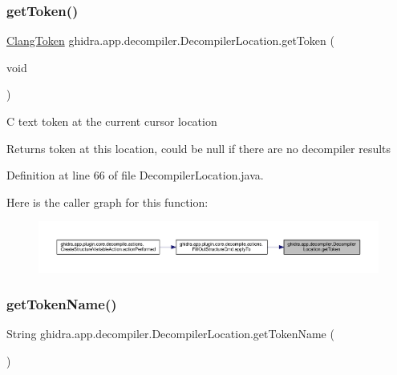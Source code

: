 \subsubsection{\texorpdfstring{getToken()}{getToken()}}
{\footnotesize\ttfamily \mbox{\hyperlink{classghidra_1_1app_1_1decompiler_1_1_clang_token}{Clang\+Token}} ghidra.\+app.\+decompiler.\+Decompiler\+Location.\+get\+Token (\begin{DoxyParamCaption}\item[{void}]{ }\end{DoxyParamCaption})\hspace{0.3cm}{\ttfamily [inline]}}

C text token at the current cursor location

\begin{DoxyReturn}{Returns}
token at this location, could be null if there are no decompiler results 
\end{DoxyReturn}


Definition at line 66 of file Decompiler\+Location.\+java.

Here is the caller graph for this function\+:
\nopagebreak
\begin{figure}[H]
\begin{center}
\leavevmode
\includegraphics[width=350pt]{classghidra_1_1app_1_1decompiler_1_1_decompiler_location_af442b0653d6dcdaa6e706c3f69da6b04_icgraph}
\end{center}
\end{figure}
\mbox{\label{classghidra_1_1app_1_1decompiler_1_1_decompiler_location_ac446838712c7137c3764b396d6369c29}} 
\subsubsection{\texorpdfstring{getTokenName()}{getTokenName()}}
{\footnotesize\ttfamily String ghidra.\+app.\+decompiler.\+Decompiler\+Location.\+get\+Token\+Name (\begin{DoxyParamCaption}{ }\end{DoxyParamCaption})\hspace{0.3cm}{\ttfamily [inline]}}



